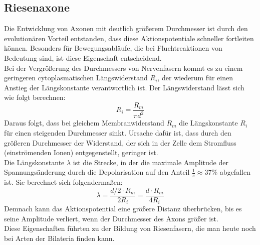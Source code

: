 \documentclass[11pt]{article}
\begin{document}
\subsection{Riesenaxone}
Die Entwicklung von Axonen mit deutlich größerem Durchmesser ist durch den evolutionären Vorteil entstanden, dass diese Aktionspotentiale schneller fortleiten können. Besonders für Bewegungsabläufe, die bei Fluchtreaktionen von Bedeutung sind, ist diese Eigenschaft entscheidend. \\
Bei der Vergrößerung des Durchmessers von Nervenfasern kommt es zu einem geringeren cytoplasmatischen Längswiderstand $R_i$, der wiederum für einen Anstieg der Längskonstante verantwortlich ist. Der Längswiderstand lässt sich wie folgt berechnen:
\begin{equation}
\label{eq1}
R_i = \dfrac{R_m}{\pi d^2}
\end{equation}
Daraus folgt, dass bei gleichem Membranwiderstand $R_m$ die Längskonstante $R_i$ für einen steigenden Durchmesser sinkt. Ursache dafür ist, dass durch den größeren Durchmesser der Widerstand, der sich in der Zelle dem Stromfluss (einströmenden Ionen) entgegenstellt, geringer ist. \\
Die Längskonstante $\lambda$ ist die Strecke, in der die maximale Amplitude der Spannungsänderung durch die Depolarisation auf den Anteil $\frac{1}{e} \approx 37\%$ abgefallen ist.  \cite{physiologie} Sie berechnet sich folgendermaßen:
\begin{equation}
\label{eq2}
\lambda = \dfrac{d/2 \cdot R_m}{2 R_i} = \dfrac{d \cdot R_m}{4 R_i}
\end{equation}
Demnach kann das Aktionspotential eine größere Distanz überbrücken, bis es seine Amplitude verliert, wenn der Durchmesser des Axons größer ist. \\
Diese Eigenschaften führten zu der Bildung von Riesenfasern, die man heute noch bei Arten der Bilateria finden kann. 
\end{document}
